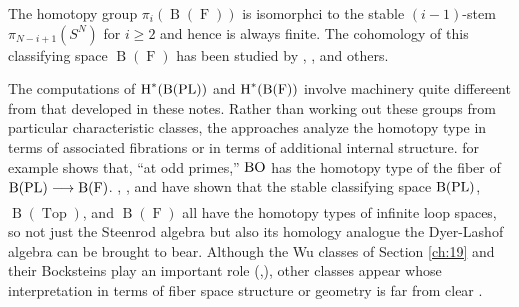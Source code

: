 \documentclass[../main]{subfiles}
\begin{document}
The homotopy group $\pi_i(\operatorname{B}(\operatorname{F}))$ is isomorphci to the stable $(i-1)$-stem $\pi_{N-i+1}(S^N)$ for $i \geq 2$ and hence is always finite. The cohomology of this classifying space $\operatorname{B}(\operatorname{F})$ has been studied by \cite{milgram}, \cite{may2006geometry}, and others.

The computations of $\operatorname{H}^\ast(\operatorname{B}(\operatorname{PL}))$ and $\operatorname{H}^\ast(\operatorname{B}(\operatorname{F}))$ involve machinery quite differeent from that developed in these notes. Rather than working out these groups from particular characteristic classes, the approaches analyze the homotopy type in terms of associated fibrations or in terms of additional internal structure. \cite{sullivan_2006} for example shows that, ``at odd primes,'' $\operatorname{BO}$ has the homotopy type of the fiber of $\operatorname{B}(\PL) \varrightarrow{} \operatorname{B}(\operatorname{F})$. \cite{boardman1973}, \cite{may2006geometry}, and \cite{SEGAL1974293} have shown that the stable classifying space $\operatorname{B}(\operatorname{PL})$, $\operatorname{B}(\operatorname{Top})$, and $\operatorname{B}(\operatorname{F})$ all have the homotopy types of infinite loop spaces, so not just the Steenrod algebra but also its homology analogue the Dyer-Lashof algebra can be brought to bear. Although the Wu classes of Section \ref{ch:19} and their Bocksteins play an important role (\cite{milnor1968},\cite{stasheff1968}), other classes appear whose interpretation in terms of fiber space structure or geometry is far from clear \cite{Ravenel1972}.
\end{document}
